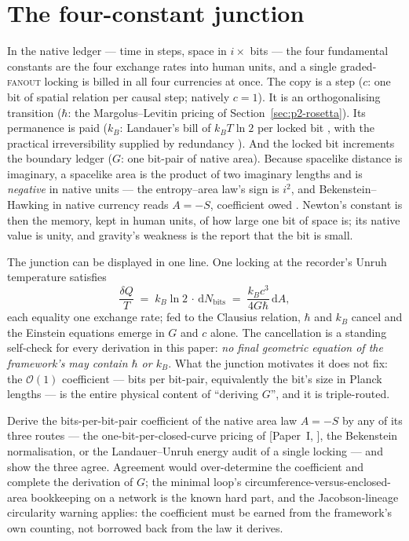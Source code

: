 \documentclass[11pt,a4paper]{article}
\newcommand{\Pone}[1]{[Paper~I, #1]} %
\newcommand{\fanout}{\textsc{fanout}}
\begin{document}
\section{The four-constant junction}
\label{sec:p2-junction}

In the native ledger --- time in steps, space in $i \times$ bits --- the four fundamental
constants are the four exchange rates into human units, and a single graded-\fanout{} locking is
billed in all four currencies at once. The copy is a step ($c$: one bit of spatial relation per
causal step; natively $c = 1$). It is an orthogonalising transition ($\hbar$: the
Margolus--Levitin pricing of Section~\ref{sec:p2-rosetta}). Its permanence is paid ($k_{B}$:
Landauer's bill of $k_{B} T \ln 2$ per locked bit \autocite{Landauer_1961}, with the practical
irreversibility supplied by redundancy \autocite{zurek_2009}). And the locked bit increments the
boundary ledger ($G$: one bit-pair of native area). Because spacelike distance is imaginary, a
spacelike area is the product of two imaginary lengths and is \emph{negative} in native units ---
the entropy--area law's sign is $i^{2}$, and Bekenstein--Hawking in native currency reads
$A = -S$, coefficient owed \autocite{brillouin1956science}. Newton's constant is then the memory,
kept in human units, of how large one bit of space is; its native value is unity, and gravity's
weakness is the report that the bit is small.

The junction can be displayed in one line. One locking at the recorder's Unruh temperature
satisfies
\begin{equation}
\frac{\delta Q}{T} \;=\; k_{B} \ln 2 \, \cdot\, \mathrm{d}N_{\mathrm{bits}}
\;=\; \frac{k_{B} c^{3}}{4 G \hbar}\, \mathrm{d}A ,
\end{equation}
each equality one exchange rate; fed to the Clausius relation, $\hbar$ and $k_{B}$ cancel and the
Einstein equations emerge in $G$ and $c$ alone. The cancellation is a standing self-check for
every derivation in this paper: \emph{no final geometric equation of the framework's may contain
$\hbar$ or $k_{B}$}. What the junction motivates it does not fix: the $\mathcal{O}(1)$
coefficient --- bits per bit-pair, equivalently the bit's size in Planck lengths --- is the
entire physical content of ``deriving $G$'', and it is triple-routed.

\begin{openproblem}\label{op:p2-coefficient}
Derive the bits-per-bit-pair coefficient of the native area law $A = -S$ by any of its three
routes --- the one-bit-per-closed-curve pricing of \Pone{}, the Bekenstein normalisation, or the
Landauer--Unruh energy audit of a single locking --- and show the three agree. Agreement would
over-determine the coefficient and complete the derivation of $G$; the minimal loop's
circumference-versus-enclosed-area bookkeeping on a network is the known hard part, and the
Jacobson-lineage circularity warning applies: the coefficient must be earned from the framework's
own counting, not borrowed back from the law it derives.
\end{openproblem}
\end{document}

